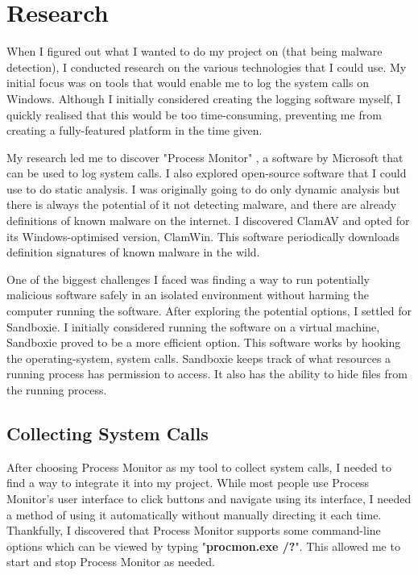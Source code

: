 \section{Research}
When I figured out what I wanted to do my project on
(that being malware detection),
I conducted research on the various technologies that I could use.
My initial focus was on tools that would enable me
to log the system calls on Windows.
Although I initially considered creating the logging software myself,
I quickly realised that this would be too time-consuming,
preventing me from creating a fully-featured platform in the time given.

My research led me to discover "Process Monitor" \cite{procmon},
a software by Microsoft that can be used to log system calls.
I also explored open-source software that
I could use to do static analysis.
I was originally going to do only dynamic analysis
but there is always the potential of it not detecting malware,
and there are already definitions of known malware on the internet.
I discovered ClamAV \cite{clamav} and opted for its Windows-optimised version, ClamWin.
This software periodically downloads definition signatures
of known malware in the wild.

One of the biggest challenges I faced was finding a way to
run potentially malicious software safely
in an isolated environment without harming the
computer running the software.
After exploring the potential options,
I settled for Sandboxie. \cite{sandboxie}
I initially considered running the software on a virtual machine,
Sandboxie proved to be a more efficient option.
This software works by hooking the operating-system, system calls.
Sandboxie keeps track of what resources a running
process has permission to access.
It also has the ability to hide files from the running process.

\subsection{Collecting System Calls}
After choosing Process Monitor \cite{procmon} as my tool to collect system calls,
I needed to find a way to integrate it into my project.
While most people use Process Monitor's user interface
to click buttons and navigate using its interface,
I needed a method of using it automatically
without manually directing it each time.
Thankfully, I discovered that Process Monitor supports some command-line
options which can be viewed by typing "\textbf{procmon.exe /?}".
This allowed me to start and stop Process Monitor as needed.

